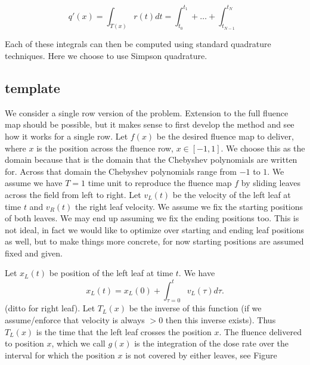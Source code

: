 \begin{equation}
q'(x) = \int_{T(x)} r(t) dt = \int_{t_0}^ {t_1} + \dots + \int_{t_{N-1}}^ {t_N}
\label{eqn:deliveredFluenceDoseSum}
\end{equation}

Each of these integrals can then be computed using standard quadrature techniques.
Here we choose to use Simpson quadrature.

\subsection{template}

We consider a single row version of the problem.
Extension to the full fluence map should be possible, but it makes sense to first develop the method and see how it works for a single row.
Let $f(x)$ be the desired fluence map to deliver, where $x$ is the position across the fluence row, $x \in [-1,1]$.
We choose this as the domain because that is the domain that the Chebyshev polynomials are written for.
Across that domain the Chebyshev polynomials range from $-1$ to $1$.
We assume we have $T=1$ time unit to reproduce the fluence map $f$ by sliding leaves across the field from left to right.
Let $v_L(t)$ be the velocity of the left leaf at time $t$ and $v_R(t)$ the right leaf velocity.
We assume we fix the starting positions of both leaves.
We may end up assuming we fix the ending positions too.
This is not ideal, in fact we would like to optimize over starting and ending leaf positions as well, but to make things more concrete, for now starting positions are assumed fixed and given.

Let $x_L(t)$ be position of the left leaf at time $t$. We have
\begin{equation}
  x_L(t) = x_L(0) + \int_{\tau=0}^t v_L(\tau) d\tau.
\end{equation}
\noindent (ditto for right leaf). Let $T_L(x)$ be the inverse of this function
(if we assume/enforce that velocity is always $>0$ then this inverse exists). Thus
$T_L(x)$ is the time that the left leaf crosses the position $x$. The fluence delivered to position
$x$, which we call $g(x)$ is the integration of the dose rate over the interval for which the position $x$ is not covered by either leaves, see Figure
 

